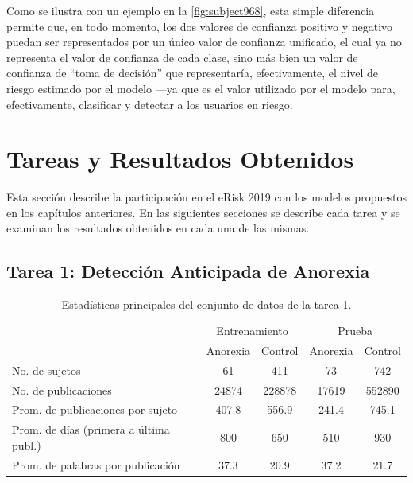 Como se ilustra con un ejemplo en la \autoref{fig:subject968}, esta simple diferencia permite que, en todo momento, los dos valores de confianza positivo y negativo puedan ser representados por un único valor de confianza unificado, el cual ya no representa el valor de confianza de cada clase, sino más bien un valor de confianza de ``toma de decisión'' que representaría, efectivamente, el nivel de riesgo estimado por el modelo ---ya que es el valor utilizado por el modelo para, efectivamente, clasificar y detectar a los usuarios en riesgo.


\section{Tareas y Resultados Obtenidos}

Esta sección describe la participación en el eRisk 2019 con los modelos propuestos en los capítulos anteriores. En las siguientes secciones se describe cada tarea  y se examinan los resultados obtenidos en cada una de las mismas.


\subsection{Tarea 1: Detección Anticipada de Anorexia}%

\begin{table}[t]
\centering
\caption{Estadísticas principales del conjunto de datos de la tarea 1.}
\label{tab:dataset-t1}
\begin{tabular}{l c c|c c}
\hline
& \multicolumn{2}{c}{Entrenamiento} & \multicolumn{2}{c}{Prueba}\\
& Anorexia & Control & Anorexia & Control \\ \hline
No. de sujetos & 61 & 411 & 73 & 742 \\
No. de publicaciones & 24874 & 228878 & 17619 & 552890 \\
Prom. de publicaciones por sujeto & 407.8 & 556.9 & 241.4 & 745.1 \\
Prom. de días (primera a última publ.) & 800 & 650 & 510 & 930 \\
Prom. de palabras por publicación & 37.3 & 20.9 & 37.2 & 21.7 \\ \hline

\hline
\end{tabular}
\end{table}


